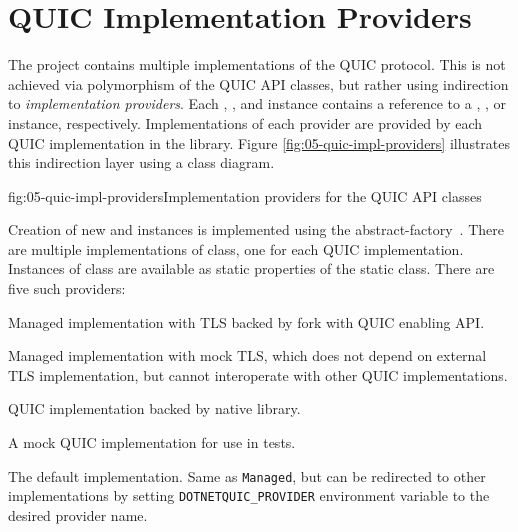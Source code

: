 
\section{QUIC Implementation Providers}

The  project contains multiple implementations of the QUIC protocol. This
is not achieved via polymorphism of the QUIC API classes, but rather using indirection to
\textit{implementation providers}. Each \QuicListener{}, \QuicConnection{}, and \QuicStream{}
instance contains a reference to a \QuicListenerProvider{}, \QuicConnectionProvider{}, or
\QuicStreamProvider{} instance, respectively. Implementations of each provider are provided by each
QUIC implementation in the  library. Figure
\autoref{fig:05-quic-impl-providers} illustrates this indirection layer using a class diagram.

\begin{myFigure}{fig:05-quic-impl-providers}{Implementation providers for the QUIC API classes}

\resizebox{0.95\linewidth}{!}{}

\end{myFigure}

Creation of new \QuicListener{} and \QuicConnection{} instances is implemented using the
\gls{abstract-factory}~\cite{wiki:abstract-factory-pattern}. There are multiple implementations of
\QuicImplementationProvider{} class, one for each QUIC implementation. Instances of
\QuicImplementationProvider{} class are available as static properties of the
 static class. There are five such providers:

\begin{itemize}

   Managed implementation with TLS backed by \libopenssl{} fork with QUIC enabling API.

   Managed implementation with mock TLS, which does not depend on external TLS implementation, but cannot interoperate with other QUIC implementations.

   QUIC implementation backed by \libmsquic{} native library.

   A mock QUIC implementation for use in tests.

   The default implementation. Same as \texttt{Managed}, but can be redirected to other implementations by setting \texttt{DOTNETQUIC_PROVIDER} environment variable to the desired provider name.

\end{itemize}

